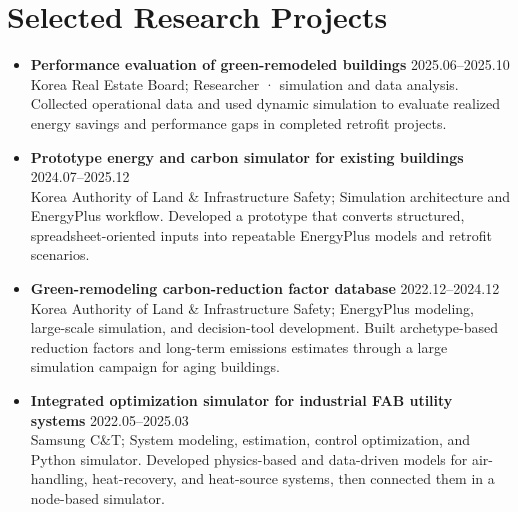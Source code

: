 \documentclass[10pt,a4paper]{article}
\begin{document}
\section*{Selected Research Projects}
\begin{itemize}[leftmargin=*]
\item \textbf{Performance evaluation of green-remodeled buildings} \hfill 2025.06–2025.10\\Korea Real Estate Board; Researcher · simulation and data analysis. Collected operational data and used dynamic simulation to evaluate realized energy savings and performance gaps in completed retrofit projects.
\item \textbf{Prototype energy and carbon simulator for existing buildings} \hfill 2024.07–2025.12\\Korea Authority of Land \& Infrastructure Safety; Simulation architecture and EnergyPlus workflow. Developed a prototype that converts structured, spreadsheet-oriented inputs into repeatable EnergyPlus models and retrofit scenarios.
\item \textbf{Green-remodeling carbon-reduction factor database} \hfill 2022.12–2024.12\\Korea Authority of Land \& Infrastructure Safety; EnergyPlus modeling, large-scale simulation, and decision-tool development. Built archetype-based reduction factors and long-term emissions estimates through a large simulation campaign for aging buildings.
\item \textbf{Integrated optimization simulator for industrial FAB utility systems} \hfill 2022.05–2025.03\\Samsung C\&T; System modeling, estimation, control optimization, and Python simulator. Developed physics-based and data-driven models for air-handling, heat-recovery, and heat-source systems, then connected them in a node-based simulator.
\end{itemize}
\end{document}
